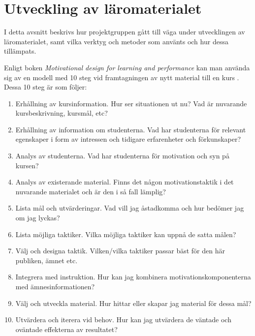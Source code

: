 \documentclass[12pt,a4paper,twoside,openright]{article}
\begin{document}
\newpage

\section{Utveckling av läromaterialet}
\label{sec:utveckling}



I detta avsnitt beskrivs hur projektgruppen gått till väga under
utvecklingen av läromaterialet, samt vilka verktyg och metoder som
använts och hur dessa tillämpats.

Enligt boken \textit{Motivational design for learning and performance}
kan man använda sig av en modell med 10 steg vid framtagningen av nytt
material till en kurs \cite{motivational_design}. Dessa 10 steg är som följer:

\begin{enumerate}
\item Erhållning av kursinformation. Hur ser situationen ut nu? Vad är
 nuvarande kursbeskrivning, kursmål, etc?

\item Erhållning av information om studenterna. Vad har studenterna
 för relevant egenskaper i form av intressen och tidigare
 erfarenheter och förkunskaper?

\item Analys av studenterna. Vad har studenterna för motivation och
 syn på kursen?

\item Analys av existerande material. Finns det någon
 motivationstaktik i det nuvarande materialet och är den i så fall
 lämplig?

\item Lista mål och utvärderingar. Vad vill jag åstadkomma och hur
 bedömer jag om jag lyckas?

\item Lista möjliga taktiker. Vilka möjliga taktiker kan uppnå de
 satta målen?

\item Välj och designa taktik. Vilken/vilka taktiker passar bäst för
 den här publiken, ämnet etc.

\item Integrera med instruktion. Hur kan jag kombinera
 motivationskomponenterna med ämnesinformationen?

\item Välj och utveckla material. Hur hittar eller skapar jag material
 för dessa mål?

\item Utvärdera och iterera vid behov. Hur kan jag utvärdera de
 väntade och oväntade effekterna av resultatet?

\end{enumerate}
\end{document}

